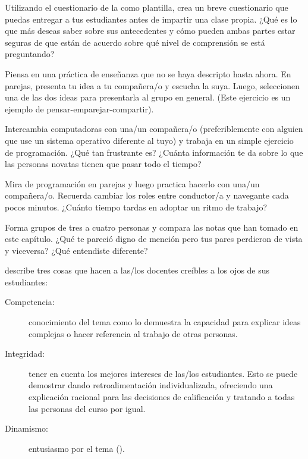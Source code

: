 Utilizando el cuestionario de la  como plantilla,
crea un breve cuestionario que puedas entregar a tus estudiantes antes de impartir una clase propia.
¿Qué es lo que más deseas saber sobre sus antecedentes
y cómo pueden ambas partes estar seguras de que están de acuerdo sobre qué nivel de comprensión se está preguntando?


Piensa en una práctica de enseñanza que no se haya descripto hasta ahora.
En parejas, presenta tu idea a tu compañera/o y escucha la suya. 
Luego, seleccionen una de las dos ideas para presentarla al grupo en general.
(Este ejercicio es un ejemplo de pensar-emparejar-compartir).


Intercambia computadoras con una/un compañera/o
(preferiblemente con alguien que use un sistema operativo diferente al tuyo)
y trabaja en un simple ejercicio de programación.
¿Qué tan frustrante es?
¿Cuánta información te da sobre lo que las personas novatas tienen que pasar todo el tiempo?


Mira  de programación en parejas
y luego practica hacerlo con una/un compañera/o.
Recuerda cambiar los roles entre conductor/a y navegante cada pocos minutos.
¿Cuánto tiempo tardas en adoptar un ritmo de trabajo?


Forma grupos de tres a cuatro personas
y compara las notas que han tomado en este capítulo.
¿Qué te pareció digno de mención pero tus pares perdieron de vista y viceversa?
¿Qué entendiste diferente?


\cite{Fink2013} describe tres cosas
que hacen a las/los docentes creíbles a los ojos de sus estudiantes:

\begin{description}

\item[Competencia:]
  conocimiento del tema
  como lo demuestra la capacidad para explicar ideas complejas
  o hacer referencia al trabajo de otras personas.
 
\item[Integridad:]
  tener en cuenta los mejores intereses de las/los estudiantes.
  Esto se puede demostrar dando retroalimentación individualizada,
  ofreciendo una explicación racional para las decisiones de calificación
  y tratando a todas las personas del curso por igual.

\item[Dinamismo:]
  entusiasmo por el tema ().

\end{description}

